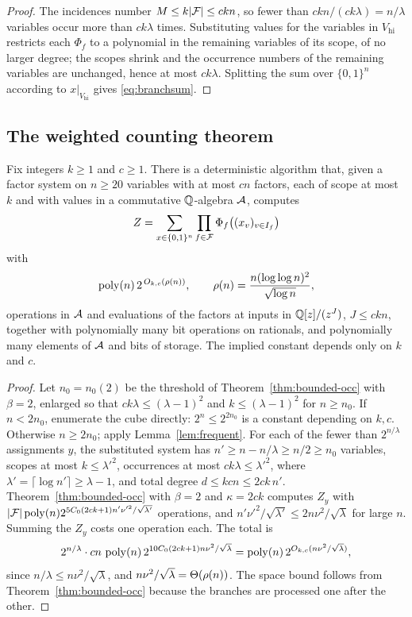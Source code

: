 \begin{proof}
The incidences number $M\le k|\mathcal{F}|\le ckn$, so fewer than $ckn/(ck\lambda)=n/\lambda$
variables occur more than $ck\lambda$ times. Substituting values for the variables
in $V_{\mathrm{hi}}$ restricts each $\Phi_f$ to a polynomial in the remaining
variables of its scope, of no larger degree; the scopes shrink and the occurrence
numbers of the remaining variables are unchanged, hence at most $ck\lambda$.
Splitting the sum over $\{0,1\}^n$ according to $x|_{V_{\mathrm{hi}}}$ gives
\eqref{eq:branchsum}.
\end{proof}

\subsection{The weighted counting theorem}
\begin{theorem}\label{thm:weighted}
Fix integers $k\ge1$ and $c\ge1$. There is a deterministic algorithm that, given
a factor system on $n\ge 20$ variables with at most $cn$ factors, each of scope at
most $k$ and with values in a commutative $\mathbb{Q}$-algebra $\mathcal{A}$, computes
\[
  Z=\sum_{x\in\{0,1\}^n}\prod_{f\in\mathcal{F}}\Phi_f\bigl((x_v)_{v\in I_f}\bigr)
\]
with
\begin{equation}\label{eq:weightedtime}
  \operatorname{poly}(n)\,2^{\,O_{k,c}(\rho(n))},\qquad \rho(n)=\frac{n(\log\log n)^2}{\sqrt{\log n}},
\end{equation}
operations in $\mathcal{A}$ and evaluations of the factors at inputs in $\mathbb{Q}[z]/(z^J)$,
$J\le ckn$, together with polynomially many bit operations on rationals, and
polynomially many elements of $\mathcal{A}$ and bits of storage. The implied constant
depends only on $k$ and $c$.
\end{theorem}

\begin{proof}
Let $n_0=n_0(2)$ be the threshold of Theorem~\ref{thm:bounded-occ} with $\beta=2$,
enlarged so that $ck\lambda\le(\lambda-1)^2$ and $k\le(\lambda-1)^2$ for
$n\ge n_0$. If $n<2n_0$, enumerate the cube directly: $2^{n}\le 2^{2n_0}$ is a
constant depending on $k,c$. Otherwise $n\ge 2n_0$; apply Lemma~\ref{lem:frequent}. For each
of the fewer than $2^{n/\lambda}$ assignments $y$, the substituted system has
$n'\ge n-n/\lambda\ge n/2\ge n_0$ variables, scopes at most $k\le\lambda'^{2}$,
occurrences at most $ck\lambda\le\lambda'^{2}$, where $\lambda'=\lceil\log n'\rceil\ge\lambda-1$,
and total degree $d\le kcn\le 2ck\,n'$. Theorem~\ref{thm:bounded-occ} with
$\beta=2$ and $\kappa=2ck$ computes $Z_y$ with
$|\mathcal{F}|\operatorname{poly}(n)2^{5C_0(2ck+1)n'\nu'^2/\sqrt{\lambda'}}$ operations, and
$n'\nu'^2/\sqrt{\lambda'}\le 2n\nu^2/\sqrt\lambda$ for large $n$. Summing the
$Z_y$ costs one operation each. The total is
\[
  2^{n/\lambda}\cdot cn\,\operatorname{poly}(n)\,2^{10C_0(2ck+1)n\nu^2/\sqrt\lambda}
  =\operatorname{poly}(n)\,2^{O_{k,c}(n\nu^2/\sqrt\lambda)},
\]
since $n/\lambda\le n\nu^2/\sqrt\lambda$, and $n\nu^2/\sqrt\lambda=\Theta(\rho(n))$.
The space bound follows from Theorem~\ref{thm:bounded-occ} because the branches
are processed one after the other.
\end{proof}


